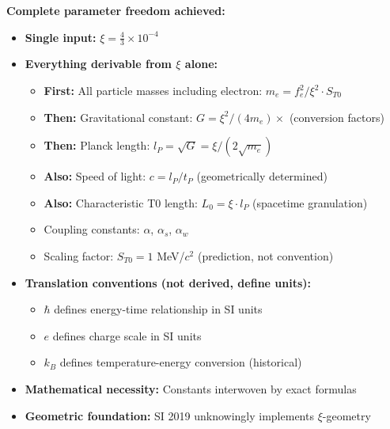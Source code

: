 \documentclass[12pt,a4paper]{article}
\begin{document}
	\begin{keyresult}
		\textbf{Complete parameter freedom achieved:}
		\begin{itemize}
			\item \textbf{Single input:} $\xi = \frac{4}{3} \times 10^{-4}$
			
			\item \textbf{Everything derivable from $\xi$ alone:}
			\begin{itemize}
				\item \textbf{First:} All particle masses including electron: $m_e = f_e^2/\xi^2 \cdot S_{T0}$
				\item \textbf{Then:} Gravitational constant: $G = \xi^2/(4m_e) \times$ (conversion factors)
				\item \textbf{Then:} Planck length: $l_P = \sqrt{G} = \xi/(2\sqrt{m_e})$
				\item \textbf{Also:} Speed of light: $c = l_P/t_P$ (geometrically determined)
				\item \textbf{Also:} Characteristic T0 length: $L_0 = \xi \cdot l_P$ (spacetime granulation)
				\item Coupling constants: $\alpha$, $\alpha_s$, $\alpha_w$
				\item Scaling factor: $S_{T0} = 1$ MeV/$c^2$ (prediction, not convention)
			\end{itemize}
			
			\item \textbf{Translation conventions (not derived, define units):}
			\begin{itemize}
				\item $\hbar$ defines energy-time relationship in SI units
				\item $e$ defines charge scale in SI units
				\item $k_B$ defines temperature-energy conversion (historical)
			\end{itemize}
			
			\item \textbf{Mathematical necessity:} Constants interwoven by exact formulas
			
			\item \textbf{Geometric foundation:} SI 2019 unknowingly implements $\xi$-geometry
		\end{itemize}
	\end{keyresult}
	
\end{document}
